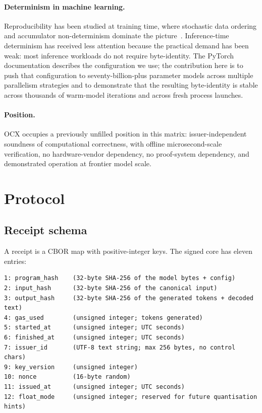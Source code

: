 \documentclass[10pt]{article}
\begin{document}
\paragraph{Determinism in machine learning.} Reproducibility has been studied at training time, where stochastic data ordering and accumulator non-determinism dominate the picture~\cite{nagarajan, pytorch_determinism}. Inference-time determinism has received less attention because the practical demand has been weak: most inference workloads do not require byte-identity. The PyTorch documentation describes the configuration we use; the contribution here is to push that configuration to seventy-billion-plus parameter models across multiple parallelism strategies and to demonstrate that the resulting byte-identity is stable across thousands of warm-model iterations and across fresh process launches.

\paragraph{Position.} OCX occupies a previously unfilled position in this matrix: issuer-independent soundness of computational correctness, with offline microsecond-scale verification, no hardware-vendor dependency, no proof-system dependency, and demonstrated operation at frontier model scale.

\section{Protocol}
\label{sec:protocol}

\subsection{Receipt schema}

A receipt is a CBOR map with positive-integer keys. The signed core has eleven entries:

\begin{lstlisting}
1: program_hash    (32-byte SHA-256 of the model bytes + config)
2: input_hash      (32-byte SHA-256 of the canonical input)
3: output_hash     (32-byte SHA-256 of the generated tokens + decoded text)
4: gas_used        (unsigned integer; tokens generated)
5: started_at      (unsigned integer; UTC seconds)
6: finished_at     (unsigned integer; UTC seconds)
7: issuer_id       (UTF-8 text string; max 256 bytes, no control chars)
9: key_version     (unsigned integer)
10: nonce          (16-byte random)
11: issued_at      (unsigned integer; UTC seconds)
12: float_mode     (unsigned integer; reserved for future quantisation hints)
\end{lstlisting}
\end{document}
